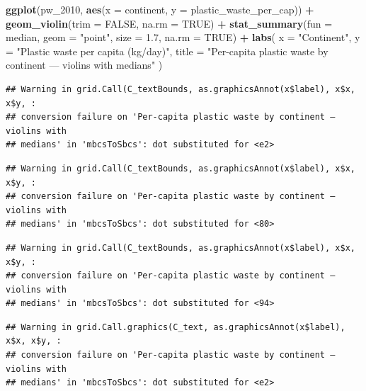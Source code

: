 \documentclass[
]{article}
\newenvironment{Shaded}{\begin{snugshade}}{\end{snugshade}}
\newcommand{\AttributeTok}[1]{\textcolor[rgb]{0.13,0.29,0.53}{#1}}
\newcommand{\ConstantTok}[1]{\textcolor[rgb]{0.56,0.35,0.01}{#1}}
\newcommand{\FloatTok}[1]{\textcolor[rgb]{0.00,0.00,0.81}{#1}}
\newcommand{\FunctionTok}[1]{\textcolor[rgb]{0.13,0.29,0.53}{\textbf{#1}}}
\newcommand{\NormalTok}[1]{#1}
\newcommand{\SpecialCharTok}[1]{\textcolor[rgb]{0.81,0.36,0.00}{\textbf{#1}}}
\newcommand{\StringTok}[1]{\textcolor[rgb]{0.31,0.60,0.02}{#1}}
\begin{document}
\begin{Shaded}
\begin{Highlighting}[]
\FunctionTok{ggplot}\NormalTok{(pw\_2010, }\FunctionTok{aes}\NormalTok{(}\AttributeTok{x =}\NormalTok{ continent, }\AttributeTok{y =}\NormalTok{ plastic\_waste\_per\_cap)) }\SpecialCharTok{+}
  \FunctionTok{geom\_violin}\NormalTok{(}\AttributeTok{trim =} \ConstantTok{FALSE}\NormalTok{, }\AttributeTok{na.rm =} \ConstantTok{TRUE}\NormalTok{) }\SpecialCharTok{+}
  \FunctionTok{stat\_summary}\NormalTok{(}\AttributeTok{fun =}\NormalTok{ median, }\AttributeTok{geom =} \StringTok{"point"}\NormalTok{, }\AttributeTok{size =} \FloatTok{1.7}\NormalTok{, }\AttributeTok{na.rm =} \ConstantTok{TRUE}\NormalTok{) }\SpecialCharTok{+}
  \FunctionTok{labs}\NormalTok{(}
    \AttributeTok{x =} \StringTok{"Continent"}\NormalTok{, }\AttributeTok{y =} \StringTok{"Plastic waste per capita (kg/day)"}\NormalTok{,}
    \AttributeTok{title =} \StringTok{"Per{-}capita plastic waste by continent — violins with medians"}
\NormalTok{  )}
\end{Highlighting}
\end{Shaded}

\begin{verbatim}
## Warning in grid.Call(C_textBounds, as.graphicsAnnot(x$label), x$x, x$y, :
## conversion failure on 'Per-capita plastic waste by continent — violins with
## medians' in 'mbcsToSbcs': dot substituted for <e2>
\end{verbatim}

\begin{verbatim}
## Warning in grid.Call(C_textBounds, as.graphicsAnnot(x$label), x$x, x$y, :
## conversion failure on 'Per-capita plastic waste by continent — violins with
## medians' in 'mbcsToSbcs': dot substituted for <80>
\end{verbatim}

\begin{verbatim}
## Warning in grid.Call(C_textBounds, as.graphicsAnnot(x$label), x$x, x$y, :
## conversion failure on 'Per-capita plastic waste by continent — violins with
## medians' in 'mbcsToSbcs': dot substituted for <94>
\end{verbatim}

\begin{verbatim}
## Warning in grid.Call.graphics(C_text, as.graphicsAnnot(x$label), x$x, x$y, :
## conversion failure on 'Per-capita plastic waste by continent — violins with
## medians' in 'mbcsToSbcs': dot substituted for <e2>
\end{verbatim}
\end{document}
